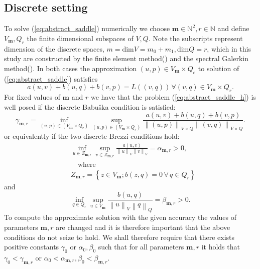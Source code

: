 \documentclass[a4paper,10pt]{article}
\newcommand{\norm}[1]{\ensuremath{\left\|#1\right\|}}
\newcommand{\mm}{\ensuremath{\mathbf{m}}}
\begin{document}
  \subsection{Discrete setting}
  To solve (\ref{eq:abstract_saddle}) numerically we choose $\mm\in\mathbb{N}^2, 
r\in\mathbb{N}$ and define $V_\mm, Q_r$ the finite dimensional subspaces
of $V, Q$. Note the subscripts represent dimension of the discrete spaces,
$m=\text{dim}{V}=m_0+m_1, \text{dim}{Q}=r$, which in this study are constructed
by the finite element method(\cite{scott}) and the spectral Galerkin
method(\cite{shen_book}). In both cases
the approximation $(u, p)\in V_{\mm}\times Q_e$ 
to solution of (\ref{eq:abstract_saddle}) satisfies
  \begin{equation}
    \label{eq:abstract_saddle_h}
    a(u, v) + b(u, q) + b(v, p) = L((v, q))\,\forall (v, q) \in V_{\mm}\times Q_r.
  \end{equation}
  For fixed values of $\mm$ and $r$ we have that the problem
  (\ref{eq:abstract_saddle_h}) is well posed if the discrete Babu\v ska condition
  is satisfied:
  \begin{equation}
    \label{eq:babuska_h}
    \gamma_{\mm, r}=\inf_{(u, p)\in \left(V_{\mm}\times Q_r\right)}
    \sup_{(u, p)\in \left(V_{\mm}\times Q_r\right)}
    \frac{a(u, v) + b(u, q) + b(v, p)}
    {\norm{(u, p)}_{V\times Q}  \norm{(v, q)}_{V\times Q}}.
  \end{equation}
  or equivalently if the two discrete Brezzi conditions hold:
  \begin{equation}
    \label{eq:brezzi_coer_h}
    \begin{aligned}
      &\inf_{u\in Z_{\mm, r}}
    \sup_{v\in Z_{\mm, r}}
    \frac{a(u,v)}{\norm{u}_V\norm{v}_V} = \alpha_{\mm, r} > 0,\\
    &\quad\text{where}\\
    & Z_{\mm, r} = \left\{z\in V_{\mm}; b(z, q)=0\,\forall\,q\in Q_r\right\}
    \end{aligned}
  \end{equation}
  and 
  \begin{equation}
    \label{eq:brezzi_infsup_h}
    \inf_{q\in Q_r}\sup_{u \in V_\mm} \frac{b(u, q)}{\norm{u}_V\norm{q}_Q}
    = \beta _{\mm, r}> 0.
  \end{equation}
  To compute the approximate solution with the given accuracy the values of
  parameters $\mm, r$ are changed and it is therefore important that
  the above conditions do not seize to hold. We shall therefore require that
  there exists positive constants $\gamma_0$ or $\alpha_0, \beta_0$ such that
  for all parameters $\mm, r$ it holds that $\gamma_0<\gamma_{\mm, r}$ or
  $\alpha_0<\alpha_{\mm, r}, \beta_0<\beta_{\mm, r}$.
 
\end{document}
